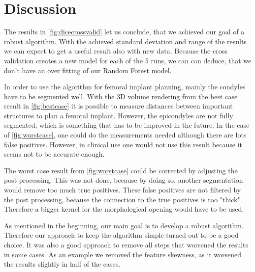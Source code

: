 \section{Discussion}
The results in \autoref{fig:dicecrossvalid} let us conclude, that we achieved our goal of a robust algorithm. With the achieved standard deviation and range of the results we can expect to get a useful result also with new data. Because the cross validation creates a new model for each of the 5 runs, we can can deduce, that we don't have an over fitting of our Random Forest model. 

In order to use the algorithm for femoral implant planning, mainly the condyles have to be segmented well. With the 3D volume rendering from the best case result in \autoref{fig:bestcase} it is possible to measure distances between important structures to plan a femoral implant. However, the epicondyles are not fully segmented, which is something that has to be improved in the future. In the case of \autoref{fig:worstcase}, one could do the measurements needed although there are lots false positives. However, in clinical use one would not use this result because it seems not to be accurate enough.

The worst case result from \autoref{fig:worstcase} could be corrected by adjusting the post processing. This was not done, because by doing so, another segmentation would remove too much true positives. These false positives are not filtered by the post processing, because the connection to the true positives is too "thick". Therefore a bigger kernel for the morphological opening would have to be used.

As mentioned in the beginning, our main goal is to develop a robust algorithm. Therefore our approach to keep the algorithm simple turned out to be a good choice. It was also a good approach to remove all steps that worsened the results in some cases. As an example we removed the feature skewness, as it worsened the results slightly in half of the cases. 